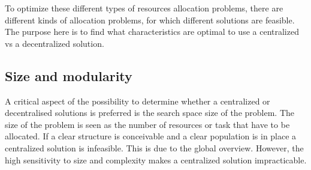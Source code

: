 To optimize these different types of resources allocation problems, there are different kinds of allocation problems, for which different solutions are feasible. The purpose here is to find what characteristics are optimal to use a centralized vs a decentralized solution.







\subsection{Size and modularity}
A critical aspect of the possibility to determine whether a centralized or decentralised solutions is preferred is the search space size of the problem. The size of the problem is seen as the number of resources or task that have to be allocated.  If a clear structure is conceivable and a clear population is in place a centralized solution is infeasible. This is due to the global overview. However, the high sensitivity to size and complexity makes a centralized solution impracticable.


